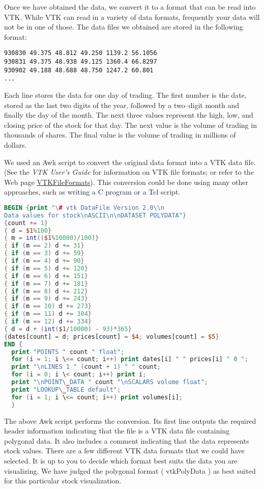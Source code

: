 Once we have obtained the data, we convert it to a format that can be read into VTK. While VTK can read in a variety of data formats, frequently your data will not be in one of those. The data files we obtained are stored in the following format:

\begin{lstlisting}[numbers=none]
930830 49.375 48.812 49.250 1139.2 56.1056
930831 49.375 48.938 49.125 1360.4 66.8297
930902 49.188 48.688 48.750 1247.2 60.801
...
\end{lstlisting}

Each line stores the data for one day of trading. The first number is the date, stored as the last two digits of the year, followed by a two--digit month and finally the day of the month. The next three values represent the high, low, and closing price of the stock for that day. The next value is the volume of trading in thousands of shares. The final value is the volume of trading in millions of dollars.

We used an Awk script to convert the original data format into a VTK data file. (See the \emph{VTK User's Guide} for information on VTK file formats; or refer to the Web page \href{https://lorensen.github.io/VTKExamples/site/VTKFileFormats/}{VTKFileFormats}). This conversion could be done using many other approaches, such as writing a C program or a Tcl script.

\begin{lstlisting}[language=Awk, caption={Awk: converting data file to VTK.}]
BEGIN {print "\# vtk DataFile Version 2.0\\n
Data values for stock\nASCII\n\nDATASET POLYDATA"}
{count += 1}
{ d = $1%100}
{ m = int(($1%10000)/100)}
{ if (m == 2) d += 31}
{ if (m == 3) d += 59}
{ if (m == 4) d += 90}
{ if (m == 5) d += 120}
{ if (m == 6) d += 151}
{ if (m == 7) d += 181}
{ if (m == 8) d += 212}
{ if (m == 9) d += 243}
{ if (m == 10) d += 273}
{ if (m == 11) d += 304}
{ if (m == 12) d += 334}
{ d = d + (int($1/10000) - 93)*365}
{dates[count] = d; prices[count] = $4; volumes[count] = $5}
END {
  print "POINTS " count " float";
  for (i = 1; i \<= count; i++) print dates[i] " " prices[i] " 0 ";
  print "\nLINES 1 " (count + 1) " " count;
  for (i = 0; i \< count; i++) print i;
  print "\nPOINT\_DATA " count "\nSCALARS volume float";
  print "LOOKUP\_TABLE default";
  for (i = 1; i \<= count; i++) print volumes[i];
  }
\end{lstlisting}

The above Awk script performs the conversion. Its first line outputs the required header information indicating that the file is a VTK data file containing polygonal data. It also includes a comment indicating that the data represents stock values. There are a few different VTK data formats that we could have selected. It is up to you to decide which format best suits the data you are visualizing. We have judged the polygonal format ( vtkPolyData ) as best suited for this particular stock visualization.

